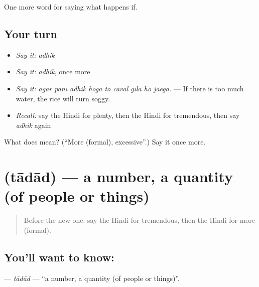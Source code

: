 \begin{grammarlens}[title={What you've built}]
One more word for saying what happens if.
\end{grammarlens}

\subsection*{Your turn}
\begin{itemize}
\raggedright
  \item \emph{Say it:} \emph{adhik}
  \item \emph{Say it:} \emph{adhik}, once more
  \item \emph{Say it:} \emph{agar pānī adhik hogā to cāval gīlā ho jāegā.} — If there is too much water, the rice will turn soggy.
  \item \emph{Recall:} say the Hindi for plenty, then the Hindi for tremendous, then say \emph{adhik} again
\end{itemize}

\begin{tcolorbox}[breakable,colback=teal!4,colframe=teal!35!black,title={Before you move on}]
What does  mean? (\textquotedblleft{}More (formal), excessive\textquotedblright{}.) Say it once more.
\end{tcolorbox}
\section[\texorpdfstring{\hi{तादाद} (tādād)}{तादाद (tādād)}]{ (tādād) — a number, a quantity (of people or things)}

\label{lesson:HI-C388-tadad}



\begin{quote}
Before the new one: say the Hindi for tremendous, then the Hindi for more (formal).
\end{quote}

\subsection*{You'll want to know: }
\textbf{} — \emph{tādād} — \textquotedblleft{}a number, a quantity (of people or things)\textquotedblright{}.

\begin{quote}
        
\end{quote}

